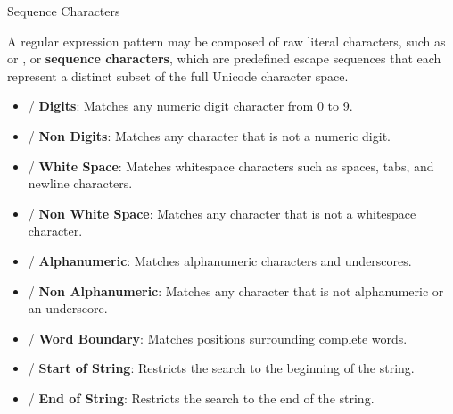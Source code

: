 \documentclass[10pt]{article}
\begin{document}
  \begin{core}[label=core:seq_char]{Sequence Characters}

    A regular expression pattern may be composed of raw literal characters, such as  or , or \textbf{sequence characters}, which are predefined escape sequences that each represent a distinct subset of the full Unicode character space.

    \begin{itemize}

      \item {} / \textbf{Digits}: Matches any numeric digit character from 0 to 9.

      \item {} / \textbf{Non Digits}: Matches any character that is not a numeric digit.

      \item {} / \textbf{White Space}: Matches whitespace characters such as spaces, tabs, and newline characters.

      \item {} / \textbf{Non White Space}: Matches any character that is not a whitespace character.

      \item {} / \textbf{Alphanumeric}: Matches alphanumeric characters and underscores.

      \item {} / \textbf{Non Alphanumeric}: Matches any character that is not alphanumeric or an underscore.

      \item {} / \textbf{Word Boundary}: Matches positions surrounding complete words.

      \item {} / \textbf{Start of String}: Restricts the search to the beginning of the string.

      \item {} / \textbf{End of String}: Restricts the search to the end of the string.

    \end{itemize}

  \end{core}
\end{document}
